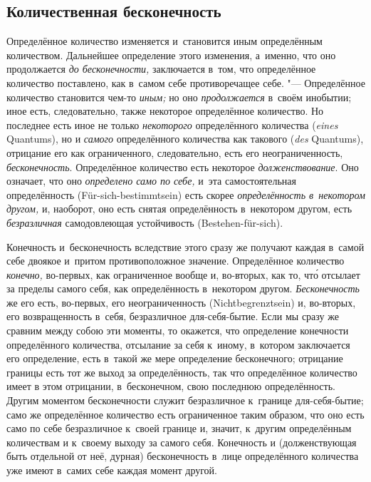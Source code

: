 \subsection{Количественная бесконечность}


Определённое количество изменяется и~становится иным определённым
количеством. Дальнейшее определение этого изменения, а~именно, что оно
продолжается {\em до бесконечности,} заключается в~том, что определённое
количество поставлено, как в~самом себе противоречащее себе. "--- Определённое
количество становится чем-то {\em иным;} но оно {\em продолжается} в~своём
инобытии; иное есть, следовательно, также некоторое определённое количество.
Но последнее есть иное не только {\em некоторого} определённого количества ({\em \!eines} Quantums),
но и {\em самого} определённого количества как такового ({\em \!des} Quantums), отрицание его как
ограниченного, следовательно, есть его неограниченность, {\em бесконечность}.
Определённое количество есть некоторое {\em долженствование}. Оно означает, что
оно {\em определено само по себе,} и~эта самостоятельная определённость
(Für-sich-bestimmt\-sein) есть скорее {\em определённость в~некотором другом,} и,
наоборот, оно есть снятая определённость в~некотором другом, есть
{\em безразличная} самодовлеющая устойчивость (Bestehen-für-sich).

Конечность и~бесконечность вследствие этого сразу же получают каждая в~самой
себе двоякое и~притом противоположное значение. Определённое количество
{\em конечно,} во-первых, как ограниченное вообще и, во-вторых, как то, чт\'{о}
отсылает за пределы самого себя, как определённость в~некотором другом.
{\em Бесконечность} же его есть, во-первых, его неограниченность (Nicht\-begrenzt\-sein) и, во-вторых,
его возвращенность в~себя, безразличное для-себя-бытие. Если мы сразу же
сравним между собою эти моменты, то окажется, что определение конечности
определённого количества, отсылание за себя к~иному, в~котором заключается его
определение, есть в~такой же мере определение бесконечного; отрицание границы
есть тот же выход за определённость, так что определённое количество имеет
в этом отрицании, в~бесконечном, свою последнюю определённость. Другим моментом
бесконечности служит безразличное к~границе для-себя-бытие; само же
определённое количество есть ограниченное таким образом, что оно есть само по
себе безразличное к~своей границе и, значит, к~другим определённым количествам
и к~своему выходу за самого себя. Конечность и (долженствующая быть отдельной
от неё, дурная) бесконечность в~лице определённого количества уже имеют в~самих
себе каждая момент другой.

